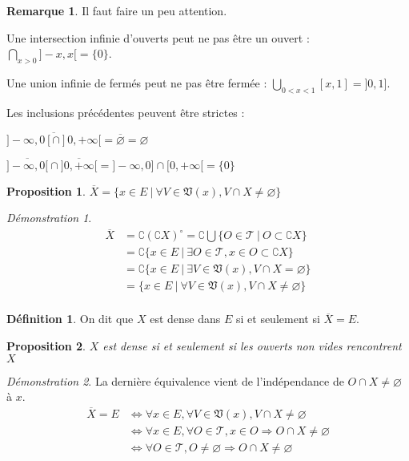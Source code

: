 \documentclass[a4paper, 11pt, french]{book}
\newenvironment{itemise}{\itemize}{\enditemize}
\theoremstyle{plain} %
\newtheorem{proposition}{Proposition}
\theoremstyle{definition} %
\newtheorem{definition}{Définition}
\newtheorem{remarque}{Remarque}
\theoremstyle{remark} %
\newtheorem*{demonstration}{Démonstration}
\newcommand{\1}{\mathds{1}}
\newcommand\vide{\varnothing}
\renewcommand{\frak}[1]{\mathfrak{#1}}
\newcommand{\scr}[1]{\mathscr{#1}}
\newcommand\ens[2]{\{#1 \ |\ #2\}}
\begin{document}
\begin{remarque}
	Il faut faire un peu attention.
	\begin{itemise}
		\item Une intersection infinie d'ouverts peut ne pas être un ouvert : $\bigcap_{x>0}]-x,x[=\{0\}$.
		\item Une union infinie de fermés peut ne pas être fermée : $\bigcup_{0<x<1}[x,1]=]0, 1]$.
		\item Les inclusions précédentes peuvent être strictes :
		\begin{itemise}
			\item $\overline{]-\infty, 0[\cap]0, +\infty[}=\overline{\vide}=\vide$
			\item $\overline{]-\infty, 0[}\cap\overline{]0, +\infty[}=]-\infty, 0]\cap[0, +\infty[=\{0\}$
		\end{itemise}
	\end{itemise}
\end{remarque}

\begin{proposition}
	$\overline{X}=\ens{x\in E}{\forall V\in\frak{V}(x), V\cap X\neq\vide}$
\end{proposition}

\begin{demonstration}
	\begin{align*}
		\overline{X}
		&=\complement(\complement X)^\circ
		=\complement\bigcup\ens{O\in\scr{T}}{O\subset\complement X} \\
		&=\complement\ens{x\in E}{\exists O\in\scr{T}, x\in O\subset\complement X} \\
		&=\complement\ens{x\in E}{\exists V\in\frak{V}(x), V\cap X=\vide} \\
		&=\ens{x\in E}{\forall V\in\frak{V}(x), V\cap X\neq\vide} \\
	\end{align*}
\end{demonstration}

\begin{definition}
	On dit que $X$ est dense dans $E$ si et seulement si $\overline{X}=E$.
\end{definition}

\begin{proposition}
	$X$ est dense si et seulement si les ouverts non vides rencontrent $X$
\end{proposition}

\begin{demonstration}
	La dernière équivalence vient de l'indépendance de $O\cap X\neq\vide$ à $x$.
	\begin{align*}
		\overline{X}=E
		&\iff\forall x\in E, \forall V\in\frak{V}(x), V\cap X\neq\vide \\
		&\iff\forall x\in E, \forall O\in\scr{T}, x\in O\Rightarrow O\cap X\neq\vide \\
		&\iff\forall O\in\scr{T}, O\neq\vide\Rightarrow O\cap X\neq\vide
	\end{align*}
\end{demonstration}
\end{document}
